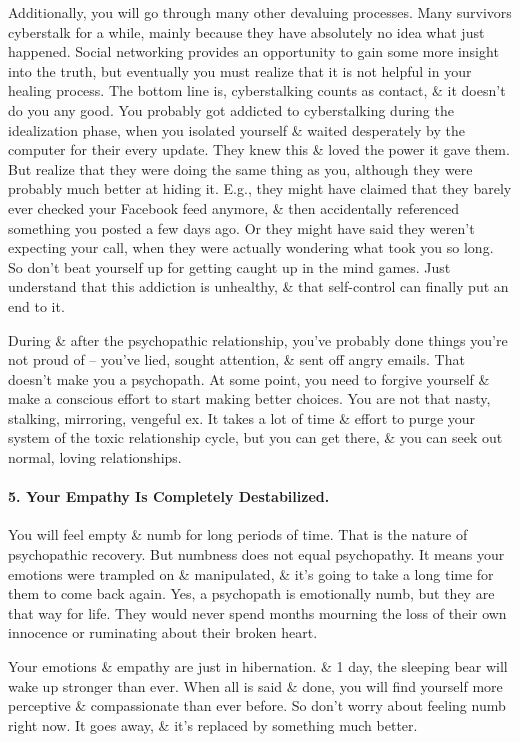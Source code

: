 \documentclass{article}
\numberwithin{equation}{section}
\begin{document}
Additionally, you will go through many other devaluing processes. Many survivors cyberstalk for a while, mainly because they have absolutely no idea what just happened. Social networking provides an opportunity to gain some more insight into the truth, but eventually you must realize that it is not helpful in your healing process. The bottom line is, cyberstalking counts as contact, \& it doesn't do you any good. You probably got addicted to cyberstalking during the idealization phase, when you isolated yourself \& waited desperately by the computer for their every update. They knew this \& loved the power it gave them. But realize that they were doing the same thing as you, although they were probably much better at hiding it. E.g., they might have claimed that they barely ever checked your Facebook feed anymore, \& then accidentally referenced something you posted a few days ago. Or they might have said they weren't expecting your call, when they were actually wondering what took you so long. So don't beat yourself up for getting caught up in the mind games. Just understand that this addiction is unhealthy, \& that self-control can finally put an end to it.

During \& after the psychopathic relationship, you've probably done things you're not proud of -- you've lied, sought attention, \& sent off angry emails. That doesn't make you a psychopath. At some point, you need to forgive yourself \& make a conscious effort to start making better choices. You are not that nasty, stalking, mirroring, vengeful ex. It takes a lot of time \& effort to purge your system of the toxic relationship cycle, but you can get there, \& you can seek out normal, loving relationships.

\paragraph{5. Your Empathy Is Completely Destabilized.} You will feel empty \& numb for long periods of time. That is the nature of psychopathic recovery. But numbness does not equal psychopathy. It means your emotions were trampled on \& manipulated, \& it's going to take a long time for them to come back again. Yes, a psychopath is emotionally numb, but they are that way for life. They would never spend months mourning the loss of their own innocence or ruminating about their broken heart.

Your emotions \& empathy are just in hibernation. \& 1 day, the sleeping bear will wake up stronger than ever. When all is said \& done, you will find yourself more perceptive \& compassionate than ever before. So don't worry about feeling numb right now. It goes away, \& it's replaced by something much better.
\end{document}
